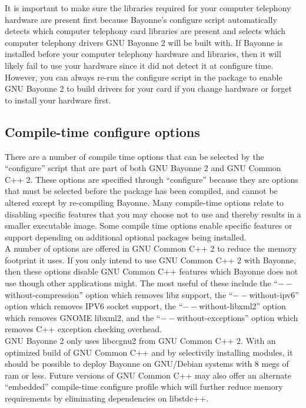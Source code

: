 \documentclass[a4paper,12pt]{article}
\begin{document}
It is important to make sure the libraries required for your computer
telephony hardware are present first because Bayonne's configure script
automatically detects which computer telephony card libraries are
present and selects which computer telephony drivers GNU Bayonne 2 will
be built with.  If Bayonne is installed before your computer telephony
hardware and libraries, then it will likely fail to use your hardware
since it did not detect it at configure time.  However, you can always
re-run the configure script in the package to enable GNU Bayonne 2 to
build drivers for your card if you change hardware or forget to install
your hardware first. \\

\subsection{Compile-time configure options}

There are a number of compile time options that can be selected by the
``configure'' script that are part of both GNU Bayonne 2 and GNU Common
C++ 2.  These options are specified through ``configure'' because they
are options that must be selected before the package has been compiled,
and cannot be altered except by re-compiling Bayonne.  Many compile-time
options relate to disabling specific features that you may choose not to
use and thereby results in a smaller executable image.  Some compile
time options enable specific features or support depending on additional optional packages 
being installed. \\

A number of options are offered in GNU Common C++ 2 to reduce the memory
footprint it uses.  If you only intend to use GNU Common C++ 2 with Bayonne,
then these options disable GNU Common C++ features which Bayonne does not use
though other applications might.  The most useful of these include the
``$--$without-compression'' option which removes libz support, the
``$--$without-ipv6'' option which removes IPV6 socket support, the
``$--$without-libxml2'' option which removes GNOME libxml2, and the
``$--$without-exceptions'' option which removes C++ exception checking
overhead. \\

GNU Bayonne 2 only uses libccgnu2 from GNU Common C++ 2.  With an
optimized build of GNU Common C++ and by selectivily installing modules,
it should be possible to deploy Bayonne on GNU/Debian systems with 8
megs of ram or less.  Future versions of GNU Common C++ may also offer
an alternate ``embedded'' compile-time configure profile which will
further reduce memory requirements by eliminating dependencies on
libstdc++. \\
\end{document}
